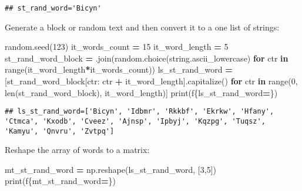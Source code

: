 \documentclass[
]{book}
\newenvironment{Shaded}{\begin{snugshade}}{\end{snugshade}}
\newcommand{\BuiltInTok}[1]{#1}
\newcommand{\ControlFlowTok}[1]{\textcolor[rgb]{0.13,0.29,0.53}{\textbf{#1}}}
\newcommand{\DecValTok}[1]{\textcolor[rgb]{0.00,0.00,0.81}{#1}}
\newcommand{\KeywordTok}[1]{\textcolor[rgb]{0.13,0.29,0.53}{\textbf{#1}}}
\newcommand{\NormalTok}[1]{#1}
\newcommand{\OperatorTok}[1]{\textcolor[rgb]{0.81,0.36,0.00}{\textbf{#1}}}
\newcommand{\SpecialCharTok}[1]{\textcolor[rgb]{0.00,0.00,0.00}{#1}}
\newcommand{\SpecialStringTok}[1]{\textcolor[rgb]{0.31,0.60,0.02}{#1}}
\newcommand{\StringTok}[1]{\textcolor[rgb]{0.31,0.60,0.02}{#1}}
\begin{document}
\begin{verbatim}
## st_rand_word='Bicyn'
\end{verbatim}

Generate a block or random text and then convert it to a one list of strings:

\begin{Shaded}
\begin{Highlighting}[]
\NormalTok{random.seed(}\DecValTok{123}\NormalTok{)}
\NormalTok{it\_words\_count }\OperatorTok{=} \DecValTok{15}
\NormalTok{it\_word\_length }\OperatorTok{=} \DecValTok{5}
\NormalTok{st\_rand\_word\_block }\OperatorTok{=} \StringTok{\textquotesingle{}\textquotesingle{}}\NormalTok{.join(random.choice(string.ascii\_lowercase) }\ControlFlowTok{for}\NormalTok{ ctr }\KeywordTok{in} \BuiltInTok{range}\NormalTok{(it\_word\_length}\OperatorTok{*}\NormalTok{it\_words\_count))}
\NormalTok{ls\_st\_rand\_word }\OperatorTok{=}\NormalTok{ [st\_rand\_word\_block[ctr: ctr }\OperatorTok{+}\NormalTok{ it\_word\_length].capitalize() }
                   \ControlFlowTok{for}\NormalTok{ ctr }\KeywordTok{in} \BuiltInTok{range}\NormalTok{(}\DecValTok{0}\NormalTok{, }\BuiltInTok{len}\NormalTok{(st\_rand\_word\_block), it\_word\_length)]}
\BuiltInTok{print}\NormalTok{(}\SpecialStringTok{f\textquotesingle{}}\SpecialCharTok{\{}\NormalTok{ls\_st\_rand\_word}\OperatorTok{=}\SpecialCharTok{\}}\SpecialStringTok{\textquotesingle{}}\NormalTok{)}
\end{Highlighting}
\end{Shaded}

\begin{verbatim}
## ls_st_rand_word=['Bicyn', 'Idbmr', 'Rkkbf', 'Ekrkw', 'Hfany', 'Ctmca', 'Kxodb', 'Cveez', 'Ajnsp', 'Ipbyj', 'Kqzpg', 'Tuqsz', 'Kamyu', 'Qnvru', 'Zvtpq']
\end{verbatim}

Reshape the array of words to a matrix:

\begin{Shaded}
\begin{Highlighting}[]
\NormalTok{mt\_st\_rand\_word }\OperatorTok{=}\NormalTok{ np.reshape(ls\_st\_rand\_word, [}\DecValTok{3}\NormalTok{,}\DecValTok{5}\NormalTok{])}
\BuiltInTok{print}\NormalTok{(}\SpecialStringTok{f\textquotesingle{}}\SpecialCharTok{\{}\NormalTok{mt\_st\_rand\_word}\OperatorTok{=}\SpecialCharTok{\}}\SpecialStringTok{\textquotesingle{}}\NormalTok{)}
\end{Highlighting}
\end{Shaded}
\end{document}
